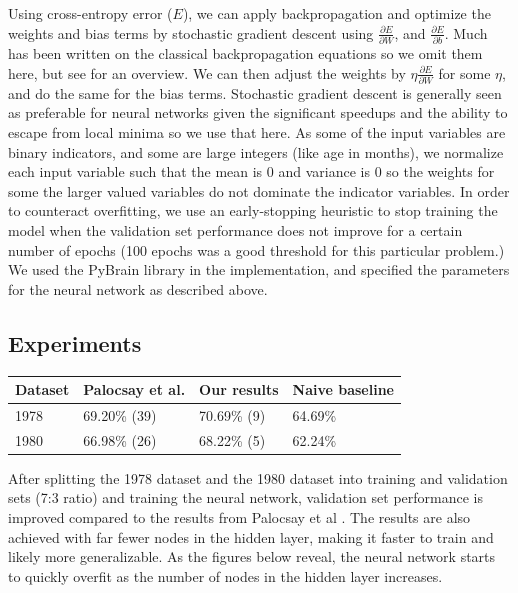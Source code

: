 \documentclass[a4paper]{article}
\theoremstyle{plain}
\begin{document}
Using cross-entropy error ($E$), we can apply backpropagation and optimize the weights and bias terms by stochastic gradient descent using $\frac{\partial E}{\partial W}$, and $\frac{\partial E}{\partial b}$. Much has been written on the classical backpropagation equations so we omit them here, but see \cite{lecun-98b} for an overview. We can then adjust the weights by $\eta \frac{\partial E}{\partial W}$ for some $\eta$, and do the same for the bias terms. Stochastic gradient descent is generally seen as preferable for neural networks given the significant speedups and the ability to escape from local minima so we use that here.\cite{lecun-98b} As some of the input variables are binary indicators, and some are large integers (like age in months), we normalize each input variable such that the mean is $0$ and variance is $0$ so the weights for some the larger valued variables do not dominate the indicator variables. In order to counteract overfitting, we use an early-stopping heuristic to stop training the model when the validation set performance does not improve for a certain number of epochs (100 epochs was a good threshold for this particular problem.) We used the PyBrain library in the implementation, and specified the parameters for the neural network as described above.

\subsection{Experiments}

\begin{center}
\begin{tabular}{l l l l}
\toprule
\textbf{Dataset} & \textbf{Palocsay et al.} & \textbf{Our results} & \textbf{Naive baseline} \\
\midrule
1978 & 69.20\% (39) & 70.69\% (9) & 64.69\% \\
1980 & 66.98\% (26) & 68.22\% (5) & 62.24\% \\
\bottomrule
\end{tabular}
\end{center} 

After splitting the 1978 dataset and the 1980 dataset into training and validation sets (7:3 ratio) and training the neural network, validation set performance is improved compared to the results from Palocsay et al \cite{bib1}. The results are also achieved with far fewer nodes in the hidden layer, making it faster to train and likely more generalizable. As the figures below reveal, the neural network starts to quickly overfit as the number of nodes in the hidden layer increases.
\end{document}
